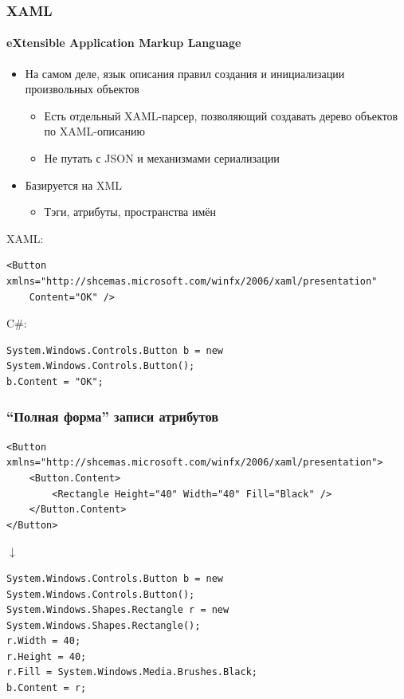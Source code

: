 \documentclass[xetex,mathserif,serif]{beamer}
\newcommand{\DownArrow} {
	\hspace{2cm}\begin{LARGE}$\downarrow$\end{LARGE}
}
\begin{document}
	\begin{frame}[fragile]
		\frametitle{XAML}
		\framesubtitle{eXtensible Application Markup Language}
		\begin{itemize}
			\item На самом деле, язык описания правил создания и инициализации произвольных объектов
			\begin{itemize}
				\item Есть отдельный XAML-парсер, позволяющий создавать дерево объектов по XAML-описанию
				\item Не путать с JSON и механизмами сериализации
			\end{itemize}
			\item Базируется на XML
			\begin{itemize}
				\item Тэги, атрибуты, пространства имён
			\end{itemize}
		\end{itemize}

		XAML:
		\begin{footnotesize}
			\begin{verbatim}
<Button xmlns="http://shcemas.microsoft.com/winfx/2006/xaml/presentation"
    Content="OK" />
			\end{verbatim}
		\end{footnotesize}

		C\#:
		\begin{footnotesize}
			\begin{verbatim}
System.Windows.Controls.Button b = new System.Windows.Controls.Button();
b.Content = "OK";
			\end{verbatim}
		\end{footnotesize}
	\end{frame}

	\begin{frame}[fragile]
		\frametitle{``Полная форма'' записи атрибутов}
		\begin{footnotesize}
			\begin{verbatim}
<Button xmlns="http://shcemas.microsoft.com/winfx/2006/xaml/presentation">
    <Button.Content>
        <Rectangle Height="40" Width="40" Fill="Black" />
    </Button.Content>
</Button>
			\end{verbatim}
		\end{footnotesize}

		\DownArrow
		\begin{footnotesize}
			\begin{verbatim}
System.Windows.Controls.Button b = new System.Windows.Controls.Button();
System.Windows.Shapes.Rectangle r = new System.Windows.Shapes.Rectangle();
r.Width = 40;
r.Height = 40;
r.Fill = System.Windows.Media.Brushes.Black;
b.Content = r;
			\end{verbatim}
		\end{footnotesize}
	\end{frame}
\end{document}
